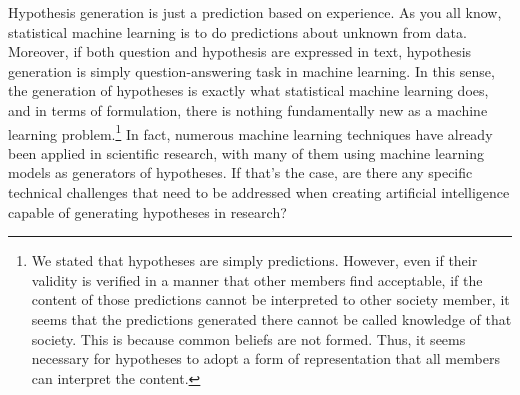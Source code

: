Hypothesis generation is just a prediction based on experience. As you all know, statistical machine learning is to do predictions about unknown from data. Moreover, if both question and hypothesis are expressed in text, hypothesis generation is simply question-answering task in machine learning. In this sense, the generation of hypotheses is exactly what statistical machine learning does, and in terms of formulation, there is nothing fundamentally new as a machine learning problem.\footnote{
We stated that hypotheses are simply predictions. However, even if their validity is verified in a manner that other members find acceptable, if the content of those predictions cannot be interpreted to other society member, it seems that the predictions generated there cannot be called knowledge of that society. This is because common beliefs are not formed. Thus, it seems necessary for hypotheses to adopt a form of representation that all members can interpret the content.
} In fact, numerous machine learning techniques have already been applied in scientific research, with many of them using machine learning models as generators of hypotheses. If that's the case, are there any specific technical challenges that need to be addressed when creating artificial intelligence capable of generating hypotheses in research? 





